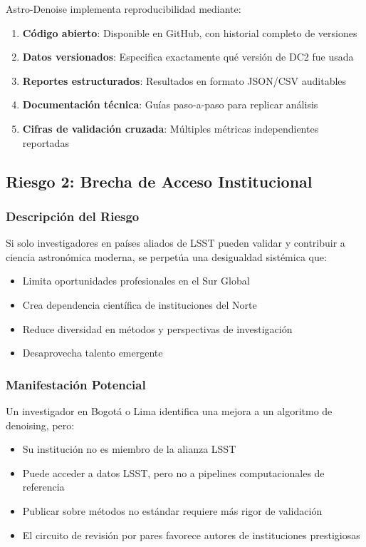 Astro-Denoise implementa reproducibilidad mediante:

\begin{enumerate}
    \item \textbf{Código abierto}: Disponible en GitHub, con historial completo de versiones
    \item \textbf{Datos versionados}: Especifica exactamente qué versión de DC2 fue usada
    \item \textbf{Reportes estructurados}: Resultados en formato JSON/CSV auditables
    \item \textbf{Documentación técnica}: Guías paso-a-paso para replicar análisis
    \item \textbf{Cifras de validación cruzada}: Múltiples métricas independientes reportadas
\end{enumerate}

\subsection{Riesgo 2: Brecha de Acceso Institucional}

\subsubsection{Descripción del Riesgo}

Si solo investigadores en países aliados de LSST pueden validar y contribuir a ciencia astronómica moderna, se perpetúa una desigualdad sistémica que:

\begin{itemize}
    \item Limita oportunidades profesionales en el Sur Global
    \item Crea dependencia científica de instituciones del Norte
    \item Reduce diversidad en métodos y perspectivas de investigación
    \item Desaprovecha talento emergente
\end{itemize}

\subsubsection{Manifestación Potencial}

Un investigador en Bogotá o Lima identifica una mejora a un algoritmo de denoising, pero:
\begin{itemize}
    \item Su institución no es miembro de la alianza LSST
    \item Puede acceder a datos LSST, pero no a pipelines computacionales de referencia
    \item Publicar sobre métodos no estándar requiere más rigor de validación
    \item El circuito de revisión por pares favorece autores de instituciones prestigiosas
\end{itemize}

